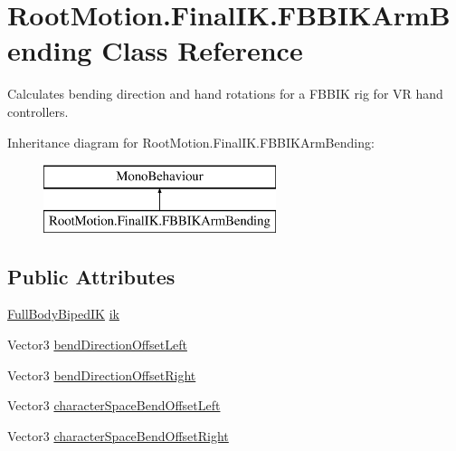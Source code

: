 \hypertarget{class_root_motion_1_1_final_i_k_1_1_f_b_b_i_k_arm_bending}{}\section{Root\+Motion.\+Final\+I\+K.\+F\+B\+B\+I\+K\+Arm\+Bending Class Reference}
\label{class_root_motion_1_1_final_i_k_1_1_f_b_b_i_k_arm_bending}


Calculates bending direction and hand rotations for a F\+B\+B\+IK rig for VR hand controllers.  


Inheritance diagram for Root\+Motion.\+Final\+I\+K.\+F\+B\+B\+I\+K\+Arm\+Bending\+:\begin{figure}[H]
\begin{center}
\leavevmode
\includegraphics[height=2.000000cm]{class_root_motion_1_1_final_i_k_1_1_f_b_b_i_k_arm_bending}
\end{center}
\end{figure}
\subsection*{Public Attributes}
\begin{DoxyCompactItemize}
\item 
\mbox{\hyperlink{class_root_motion_1_1_final_i_k_1_1_full_body_biped_i_k}{Full\+Body\+Biped\+IK}} \mbox{\hyperlink{class_root_motion_1_1_final_i_k_1_1_f_b_b_i_k_arm_bending_a8cf7b9fe2c387a349b68c3b2ae61028f}{ik}}
\item 
Vector3 \mbox{\hyperlink{class_root_motion_1_1_final_i_k_1_1_f_b_b_i_k_arm_bending_a2c3cf493802ad83d760d0b6add222e33}{bend\+Direction\+Offset\+Left}}
\item 
Vector3 \mbox{\hyperlink{class_root_motion_1_1_final_i_k_1_1_f_b_b_i_k_arm_bending_a67c0dc9303c7a8459a96504229d2b6f4}{bend\+Direction\+Offset\+Right}}
\item 
Vector3 \mbox{\hyperlink{class_root_motion_1_1_final_i_k_1_1_f_b_b_i_k_arm_bending_aa3161ca58035064f99462f507bfd13a8}{character\+Space\+Bend\+Offset\+Left}}
\item 
Vector3 \mbox{\hyperlink{class_root_motion_1_1_final_i_k_1_1_f_b_b_i_k_arm_bending_af8a617ec1d0747e23ed7dc898bbd6b02}{character\+Space\+Bend\+Offset\+Right}}
\end{DoxyCompactItemize}


